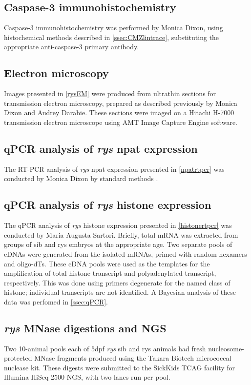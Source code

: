 \documentclass{ut-thesis}
\begin{document}
\begin{NoHyper}
\subsection{Caspase-3 immunohistochemistry}
\label{ssec:ryscaspase}
Caspase-3 immunohistochemistry was performed by Monica Dixon, using histochemical methods described in \autoref{ssec:CMZlintrace}, substituting the appropriate anti-caspase-3 primary antibody.

\subsection{Electron microscopy}
\label{ssec:rysEM}
Images presented in \autoref{rysEM} were produced from ultrathin sections for transmission electron microscopy, prepared as described previously \cite{Lindsey2012} by Monica Dixon and Audrey Darabie. These sections were imaged on a Hitachi H-7000 transmission electron microscope using AMT Image Capture Engine software. 

\subsection{qPCR analysis of \textit{rys} npat expression}
\label{ssec:rysPCR}
The RT-PCR analysis of \textit{rys} npat expression presented in \autoref{npatrtpcr} was conducted by Monica Dixon by standard methods \cite{Sambrook1989}.

\subsection{qPCR analysis of \textit{rys} histone expression}
\label{ssec:rysqPCR}
The qPCR analysis of \textit{rys} histone expression presented in \autoref{histonertpcr} was conducted by Maria Augusta Sartori. Briefly, total mRNA was extracted from groups of sib and rys embryos at the appropriate age. Two separate pools of cDNAs were generated from the isolated mRNAs, primed with random hexamers and oligo-dTs. These cDNA pools were used as the templates for the amplification of total histone transcript and polyadenylated transcript, respectively. This was done using primers degenerate for the named class of histone; individual transcripts are not identified. A Bayesian analysis of these data was perfomed in \autoref{ssec:qPCR}. 

\subsection{\textit{rys} MNase digestions and NGS}
Two 10-animal pools each of 5dpf \textit{rys} sib and rys animals had fresh nucleosome-protected MNase fragments produced using the Takara Biotech micrococcal nuclease kit. These digests were submitted to the SickKids TCAG  facility for Illumina HiSeq 2500 NGS, with two lanes run per pool.


\end{NoHyper}
\end{document}
